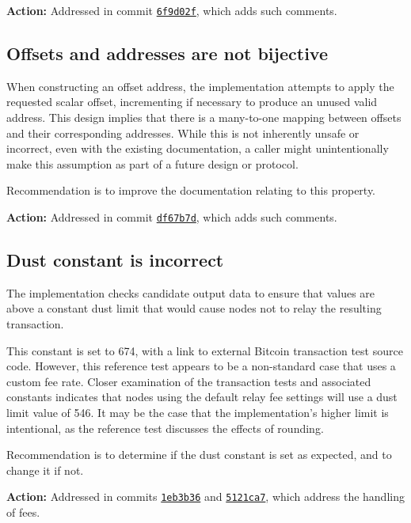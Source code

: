 \documentclass{article}
\begin{document}
\textbf{Action:} Addressed in commit \href{https://github.com/serai-dex/serai/commit/6f9d02fdf83e426b0a4a0df9c851de5911067a5e}{\texttt{6f9d02f}}, which adds such comments.


\subsection{Offsets and addresses are not bijective}

When constructing an offset address, the implementation attempts to apply the requested scalar offset, incrementing if necessary to produce an unused valid address.
This design implies that there is a many-to-one mapping between offsets and their corresponding addresses.
While this is not inherently unsafe or incorrect, even with the existing documentation, a caller might unintentionally make this assumption as part of a future design or protocol.

Recommendation is to improve the documentation relating to this property.

\textbf{Action:} Addressed in commit \href{https://github.com/serai-dex/serai/commit/df67b7d94c56ef8f75994e02885bb5c78314ef13}{\texttt{df67b7d}}, which adds such comments.


\subsection{Dust constant is incorrect}

The implementation checks candidate output data to ensure that values are above a constant dust limit that would cause nodes not to relay the resulting transaction.

This constant is set to 674, with a link to external Bitcoin transaction test source code.
However, this reference test appears to be a non-standard case that uses a custom fee rate.
Closer examination of the transaction tests and associated constants indicates that nodes using the default relay fee settings will use a dust limit value of 546.
It may be the case that the implementation's higher limit is intentional, as the reference test discusses the effects of rounding.

Recommendation is to determine if the dust constant is set as expected, and to change it if not.

\textbf{Action:} Addressed in commits \href{https://github.com/serai-dex/serai/commit/1eb3b364f46e003b92baed89dcdef3e4878c79aa}{\texttt{1eb3b36}} and \href{https://github.com/serai-dex/serai/commit/5121ca75199dff7bd34230880a1fdd793012068c}{\texttt{5121ca7}}, which address the handling of fees.
\end{document}
